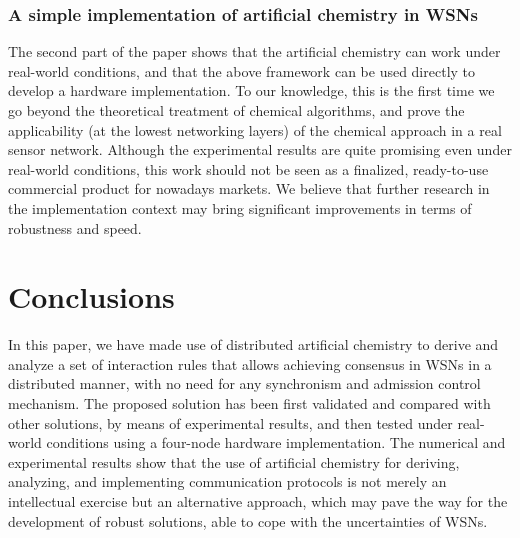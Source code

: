 \documentclass[journal]{IEEEtran}
\begin{document}
{\subsubsection{A simple implementation of artificial chemistry in WSNs}
{The second part of the paper shows that the artificial chemistry can work under real-world conditions, and that the above framework can be used directly to develop a hardware implementation. To our knowledge, this is the first time we go beyond the theoretical treatment of chemical algorithms, and prove the applicability (at the lowest networking layers) of the chemical approach in a real sensor network. 
Although the experimental results are quite promising even under real-world conditions, this work should not be seen as a finalized, ready-to-use commercial product for nowadays markets. We believe that further research in the implementation context may bring significant improvements in terms of robustness and speed.
}

\section{Conclusions}
\label{sec:Conclusion}


In this paper, we have made use of distributed artificial chemistry to derive and analyze a set of interaction rules that allows achieving consensus in WSNs in a distributed manner, with no need for any synchronism and admission control mechanism. The proposed solution has been first validated and compared with other solutions, by means of experimental results, and then tested under real-world conditions using a four-node hardware implementation. The numerical and experimental results show that the use of artificial chemistry for deriving, analyzing, and implementing communication protocols is not merely an intellectual exercise but an {alternative} approach, which may pave the way for the development of robust solutions, able to cope with the uncertainties of WSNs. 

}
\end{document}
